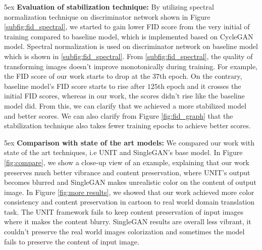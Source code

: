 \documentclass[conference]{IEEEtran}
\begin{document}
\parindent 5ex \textbf{Evaluation of stabilization technique:}
By utilizing spectral normalization technique on discriminator network shown in Figure \ref{subfig:fid_spectral}, we started to gain lower FID score from the very initial of training compared to baseline model, which is implemented based on CycleGAN\cite{DBLP:conf/iccv/ZhuPIE17} model. Spectral normalization is used on discriminator network on baseline model which is shown in \ref{subfig:fid_spectral}. From \ref{subfig:fid_spectral}, the quality of transforming images doesn't improve monotonically during training. For example, the FID score of our work starts to drop at the $37$th epoch. On the contrary, baseline model's FID score starts to rise after $125$th epoch and it crosses the initial FID scores, whereas in our work, the scores didn't rise like the baseline model did. From this, we can clarify that we achieved a more stabilized model and better scores. We can also clarify from Figure \ref{fig:fid_graph} that the stabilization technique also takes fewer training epochs to achieve better scores. %


\parindent 5ex \textbf{Comparison with state of the art models:}
We compared our work with state of the art techniques, i.e UNIT \cite{DBLP:journals/corr/LiuBK17} and SingleGAN's base model\cite{DBLP:journals/corr/abs-1810-04991}. In Figure \ref{fig:compare}, we show a close-up view of an example, explaining that our work preserves much better vibrance and content preservation, where UNIT's\cite{DBLP:journals/corr/LiuBK17} output becomes blurred and SingleGAN\cite{DBLP:journals/corr/abs-1810-04991} makes unrealistic color on the content of output image.  %
In Figure \ref{fig:more results}, we showed that our work achieved more color consistency and content preservation in cartoon to real world domain translation task. The UNIT\cite{DBLP:journals/corr/LiuBK17} framework fails to keep content preservation of input images where it makes the content blurry. SingleGAN\cite{DBLP:journals/corr/abs-1810-04991} results are overall less vibrant, it couldn't preserve the real world images colorization and sometimes the model fails to preserve the content of input image.
\end{document}
